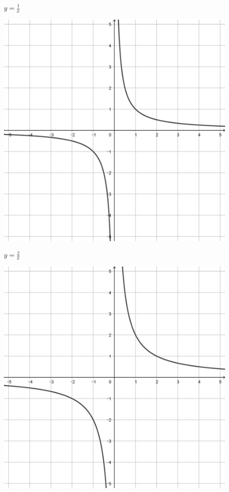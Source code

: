 \documentclass[a4paper]{oblivoir}
\begin{document}
\clearpage
\begin{minipage}{0.45\textwidth}\centering
\(y=\frac1x\)
\par\bigskip\includegraphics[width=0.9\textwidth]{img/18-1}
\end{minipage}
\begin{minipage}{0.45\textwidth}\centering
\(y=\frac2x\)
\par\bigskip\includegraphics[width=0.9\textwidth]{img/18-2}
\end{minipage}\bigskip\bigskip\par
\end{document}
